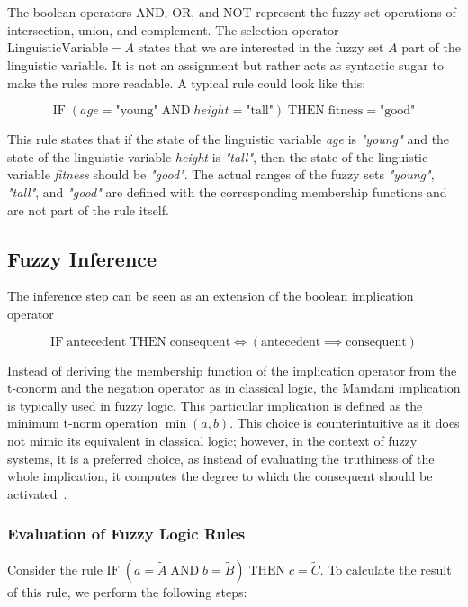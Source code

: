 The boolean operators AND, OR, and NOT represent the fuzzy set operations of intersection, union, and complement. The selection operator $\text{LinguisticVariable} = \tilde{A}$ states that we are interested in the fuzzy set $\tilde{A}$ part of the linguistic variable. It is not an assignment but rather acts as syntactic sugar to make the rules more readable. A typical rule could look like this:

\begin{equation*}
      \text{IF} \;( age = \text{"young"} \; \text{AND} \; height = \text{"tall"} ) \; \text{THEN} \; \text{fitness} = \text{"good"}
\end{equation*}

This rule states that if the state of the linguistic variable \emph{age} is \emph{"young"} and the state of the linguistic variable \emph{height} is \emph{"tall"}, then the state of the linguistic variable \emph{fitness} should be \emph{"good"}. The actual ranges of the fuzzy sets \emph{"young"}, \emph{"tall"}, and \emph{"good"} are defined with the corresponding membership functions and are not part of the rule itself.

\subsection{Fuzzy Inference}

The inference step can be seen as an extension of the boolean implication operator

\begin{equation*}
      \text{IF} \; \text{antecedent} \; \text{THEN} \; \text{consequent} \iff (\text{antecedent} \implies \text{consequent})
\end{equation*}

Instead of deriving the membership function of the implication operator from the t-conorm and the negation operator as in classical logic, the Mamdani implication is typically used in fuzzy logic. This particular implication is defined as the minimum t-norm operation $\min(a,b)$. This choice is counterintuitive as it does not mimic its equivalent in classical logic; however, in the context of fuzzy systems, it is a preferred choice, as instead of evaluating the truthiness of the whole implication, it computes the degree to which the consequent should be activated~\cite{BouchonMeunier1995}.

\subsubsection{Evaluation of Fuzzy Logic Rules}
Consider the rule \emph{$\text{IF} \; (a = \tilde{A} \; \text{AND} \; b = \tilde{B})\; \text{THEN} \; c = \tilde{C}$}. To calculate the result of this rule, we perform the following steps:

